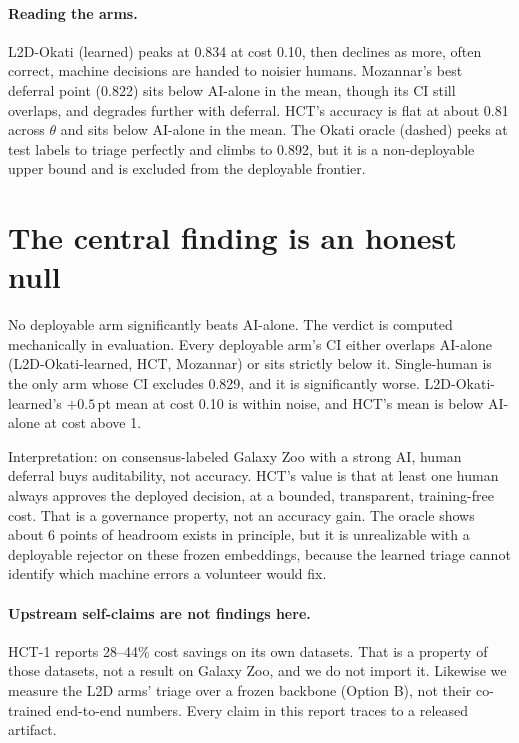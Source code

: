 \documentclass[10pt]{article}
\begin{document}
\paragraph{Reading the arms.}
L2D-Okati (learned) peaks at 0.834 at cost 0.10, then declines as more, often correct, machine
decisions are handed to noisier humans. Mozannar's best deferral point (0.822) sits below AI-alone
in the mean, though its CI still overlaps, and degrades further with deferral. HCT's accuracy is
flat at about 0.81 across $\theta$ and sits below AI-alone in the mean. The Okati oracle (dashed)
peeks at test labels to triage perfectly and climbs to 0.892, but it is a non-deployable upper bound
and is excluded from the deployable frontier.

\section{The central finding is an honest null}

No deployable arm significantly beats AI-alone. The verdict is computed mechanically in evaluation.
Every deployable arm's CI either overlaps AI-alone (L2D-Okati-learned, HCT, Mozannar) or sits
strictly below it. Single-human is the only arm whose CI excludes 0.829, and it is significantly
worse. L2D-Okati-learned's $+0.5$\,pt mean at cost 0.10 is within noise, and HCT's mean is below
AI-alone at cost above 1.

Interpretation: on consensus-labeled Galaxy Zoo with a strong AI, human deferral buys auditability,
not accuracy. HCT's value is that at least one human always approves the deployed decision, at a
bounded, transparent, training-free cost. That is a governance property, not an accuracy gain. The
oracle shows about 6 points of headroom exists in principle, but it is unrealizable with a
deployable rejector on these frozen embeddings, because the learned triage cannot identify which
machine errors a volunteer would fix.

\paragraph{Upstream self-claims are not findings here.}
HCT-1 \citep{berger2026hct} reports 28--44\% cost savings on its own datasets. That is a property of those datasets, not a
result on Galaxy Zoo, and we do not import it. Likewise we measure the L2D arms' triage over a
frozen backbone (Option B), not their co-trained end-to-end numbers. Every claim in this report
traces to a released artifact.
\end{document}
